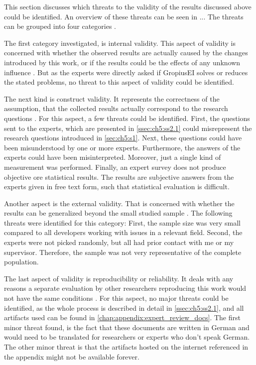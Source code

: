 This section discusses which threats to the validity of the results discussed above could be identified.
An overview of these threats can be seen in ...
The threats can be grouped into four categories \cite{runeson2009guidelines}.

The first category investigated, is internal validity.
This aspect of validity is concerned with whether the observed results are actually caused by the changes introduced by this work,
or if the results could be the effects of any unknown influence \cite{runeson2009guidelines}.
But as the experts were directly asked if \gls{GropiusEI} solves or reduces the stated problems, no threat to this aspect of validity could be identified.

The next kind is construct validity.
It represents the correctness of the assumption, that the collected results actually correspond to the research questions \cite{runeson2009guidelines}.
For this aspect, a few threats could be identified.
First, the questions sent to the experts, which are presented in \cref{ssec:ch5:ss2.1} could misrepresent the research questions 
introduced in \cref{sec:ch5:s1}.
Next, these questions could have been misunderstood by one or more experts.
Furthermore, the answers of the experts could have been misinterpreted.
Moreover, just a single kind of measurement was performed.
Finally, an expert survey does not produce objective ore statistical results.
The results are subjective answers from the experts given in free text form, such that statistical evaluation is difficult. 

Another aspect is the external validity.
That is concerned with whether the results can be generalized beyond the small studied sample \cite{runeson2009guidelines}.
The following threats were identified for this category:
First, the sample size was very small compared to all developers working with issues in a relevant field.
Second, the experts were not picked randomly, but all had prior contact with me or my supervisor.
Therefore, the sample was not very representative of the complete population.

The last aspect of validity is reproducibility or reliability.
It deals with any reasons a separate evaluation by other researchers reproducing this work would not have the same conditions \cite{runeson2009guidelines}.
For this aspect, no major threats could be identified, as the whole process is described in detail in \cref{ssec:ch5:ss2.1}, and all artifacts used can be found in \cref{chap:appendix:expert_review_docs}.
The first minor threat found, is the fact that these documents are written in German and would need to be translated for researchers or experts who don't speak German.
The other minor threat is that the artifacts hosted on the internet referenced in the appendix might not be available forever.